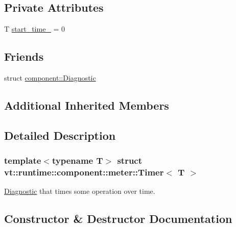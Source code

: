 \subsection*{Private Attributes}
\begin{DoxyCompactItemize}
\item 
T \hyperlink{structvt_1_1runtime_1_1component_1_1meter_1_1_timer_a097137934875f01d9e9ed8653916df64}{start\+\_\+time\+\_\+} = 0
\end{DoxyCompactItemize}
\subsection*{Friends}
\begin{DoxyCompactItemize}
\item 
struct \hyperlink{structvt_1_1runtime_1_1component_1_1meter_1_1_timer_a48f263de9dbf26c1fc7736031cca9613}{component\+::\+Diagnostic}
\end{DoxyCompactItemize}
\subsection*{Additional Inherited Members}


\subsection{Detailed Description}
\subsubsection*{template$<$typename T$>$\newline
struct vt\+::runtime\+::component\+::meter\+::\+Timer$<$ T $>$}

\hyperlink{structvt_1_1runtime_1_1component_1_1_diagnostic}{Diagnostic} that times some operation over time. 

\subsection{Constructor \& Destructor Documentation}
\mbox{\label{structvt_1_1runtime_1_1component_1_1meter_1_1_timer_af32ee3397a43cd6af675904d70295211}} 
